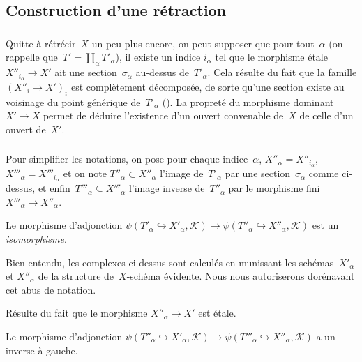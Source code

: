\documentclass[10pt]{../fichiers-configuration-latex/smfart}
\begin{document}
\subsection{Construction d'une rétraction}

\subsubsection{}
Quitte à rétrécir $X$ un peu plus encore, on peut supposer que pour tout $α$
(on rappelle que $T′= ∐_α T′_α$), il existe un indice $i_α$ tel que le morphisme étale $X″_{i_α}→X'$
ait une section $σ_α$ au-dessus de $T'_α$. Cela résulte
du fait que la famille $(X″_i→X')_i$ est complètement
décomposée, de sorte qu'une section existe au voisinage du point
générique de $T'_α$ ().
La propreté du morphisme dominant $X'→X$ permet de
déduire l'existence d'un ouvert convenable de $X$
de celle d'un ouvert de $X′$.


\subsubsection{}
Pour simplifier les notations, on pose pour chaque indice $α$,
$X″_α=X″_{i_α}$, $X‴_α=X‴_{i_α}$ et on note $T″_α⊂X″_α$
l'image de $T'_α$ par une section $σ_α$ comme ci-dessus,
et enfin $T‴_α ⊆ X‴_α$ l'image inverse de $T″_α$
par le morphisme fini $X‴_α → X″_α$.

\begin{proposition2}
Le morphisme d'adjonction $ψ(T'_α ↪ X′_α,𝒦)→ ψ(T″_α ↪ X″_α,𝒦)$ est un \emph{isomorphisme}.
\end{proposition2}

Bien entendu, les complexes ci-dessus sont calculés en
munissant les schémas $X′_α$ et $X″_α$ de la structure
de $X$-schéma évidente. Nous nous autoriserons dorénavant
cet abus de notation.

\begin{démo}
Résulte du fait que le morphisme $X″_α→X'$ est étale.
\end{démo}

\begin{proposition2}
Le morphisme d'adjonction $ψ(T″_α↪ X′_α,𝒦)→ ψ(T‴_α↪ X″_α,𝒦)$ a un inverse à gauche.
\end{proposition2}
\end{document}
